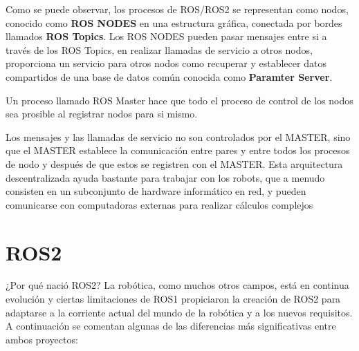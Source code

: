 Como se puede observar, los procesos de ROS/ROS2 se representan como nodos, conocido como \textbf{ROS NODES} en una estructura gráfica, conectada por bordes llamados \textbf{ROS Topics}. Los ROS NODES pueden pasar mensajes entre si a través de los ROS Topics, en realizar llamadas de servicio a otros nodos, proporciona un servicio para otros nodos como recuperar y establecer datos compartidos de una base de datos común conocida como \textbf{Paramter Server}.

Un proceso llamado ROS Master hace que todo el proceso de control de los nodos sea prosible al registrar nodos para si mismo.

Los mensajes y las llamadas de servicio no son controlados por el MASTER, sino que el MASTER establece la comunicación entre pares y entre todos los procesos de nodo y después de que estos se registren con el MASTER. Esta arquitectura descentralizada ayuda bastante para trabajar con los robots, que a menudo consisten en un subconjunto de hardware informático en red, y pueden comunicarse con computadoras externas para realizar cálculos complejos

\section{ROS2}

¿Por qué nació ROS2? La robótica, como muchos otros campos, está en continua evolución y ciertas limitaciones de ROS1 propiciaron la creación de ROS2 para adaptarse a la corriente actual del mundo de la robótica y a los nuevos requisitos. A continuación se comentan algunas de las diferencias más significativas entre ambos proyectos:


